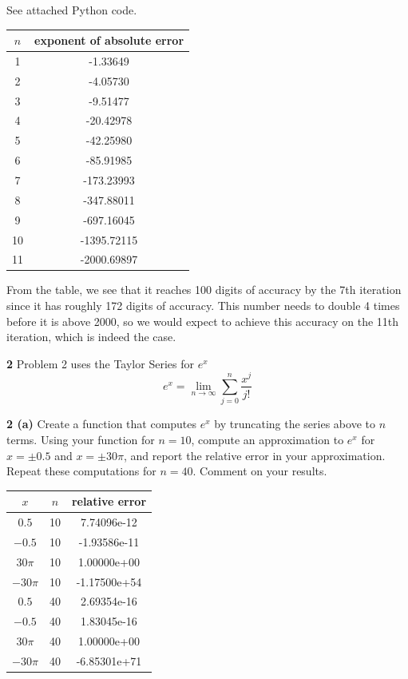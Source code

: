 \documentclass[12pt]{article}
\begin{document}
	See attached Python code.\bigbreak
	
	\begin{center}
		\begin{tabular}{|c|c|}
			\hline
			$n$ & exponent of absolute error \\ \hline
			1 & -1.33649 \\ \hline
			2 & -4.05730 \\ \hline
			3 & -9.51477 \\ \hline
			4 & -20.42978 \\ \hline
			5 & -42.25980 \\ \hline
			6 & -85.91985 \\ \hline
			7 & -173.23993 \\ \hline
			8 & -347.88011 \\ \hline
			9 & -697.16045 \\ \hline
			10 & -1395.72115 \\ \hline
			11 & -2000.69897 \\ \hline
		\end{tabular}
	\end{center}
	
	From the table, we see that it reaches 100 digits of accuracy by the 7th iteration since it has roughly 172 digits of accuracy. This number needs to double 4 times before it is above 2000, so we would expect to achieve this accuracy on the 11th iteration, which is indeed the case. \bigbreak
	
\hspace{-7 ex}\textbf{2} Problem 2 uses the Taylor Series for $e^x$ \\
$$ e^x = \lim\limits_{n \to \infty} \sum\limits_{j=0}^{n} \frac{x^j}{j!} $$

\hspace{-7 ex}\textbf{2 (a)} Create a function that computes $e^x$ by truncating the series above to $n$ terms. Using your function for $n = 10$, compute an approximation to $e^x$ for $x = \pm 0.5$ and $x = \pm30\pi$, and report the relative error in your approximation. Repeat these computations for $n = 40$. Comment on your results. \bigbreak

	\begin{center}
		\begin{tabular}{|c|c|c|}
			\hline
			$x$ & $n$ & relative error \\ \hline
			$0.5$ & 10 & 7.74096e-12 \\ \hline
			$-0.5$ & 10 & -1.93586e-11 \\ \hline
			$30\pi$ & 10 & 1.00000e+00 \\ \hline
			$-30\pi$ & 10 & -1.17500e+54 \\ \hline
			$0.5$ & 40 & 2.69354e-16 \\ \hline
			$-0.5$ & 40 & 1.83045e-16 \\ \hline
			$30\pi$ & 40 & 1.00000e+00 \\ \hline
			$-30\pi$ & 40 & -6.85301e+71 \\ \hline
		\end{tabular}
	\end{center}
	
\end{document}
